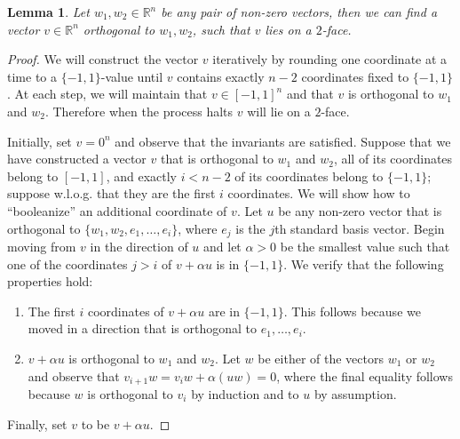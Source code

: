 \documentclass[11pt]{article}
\newtheorem{lemma}[theorem]{Lemma}
\begin{document}
\begin{lemma} \label{lem:orthogonal_vector}
Let $w_1, w_2 \in \mathbb{R}^n$ be any pair of non-zero vectors, then we can find a vector $v \in \mathbb{R}^n$ orthogonal to $w_1, w_2$, such that $v$ lies on a $2$-face.
\end{lemma}
\begin{proof}
	We will construct the vector $v$ iteratively by rounding one coordinate at a time to a $\{-1,1\}$-value until $v$ contains exactly $n-2$ coordinates fixed to $\{-1,1\}$. At each step, we will maintain that $v \in [-1,1]^n$ and that $v$ is orthogonal to $w_1$ and $w_2$. Therefore when the process halts $v$ will lie on a $2$-face.
	
	Initially, set $v = 0^n$ and observe that the invariants are satisfied. Suppose that we have constructed a vector $v$ that is orthogonal to $w_1$ and $w_2$, all of its coordinates belong to $[-1,1]$, and exactly $i < n-2$ of its coordinates belong to $\{-1,1\}$; suppose w.l.o.g. that they are the first $i$ coordinates. We will show how to ``booleanize'' an additional coordinate of $v$. Let $u$ be any non-zero vector that is orthogonal to $\{w_1, w_2, e_1, \ldots, e_i\}$, where $e_j$ is the $j$th standard basis vector. Begin moving from $v$ in the direction of $u$ and let $\alpha > 0$ be the smallest value such that one of the coordinates $j > i$ of $v + \alpha u$ is in $\{-1, 1\}$. %
	We verify that the following properties hold:
	\begin{enumerate}
		\item The first $i$ coordinates of $v + \alpha u$ are in $\{ -1, 1\}$. This follows because we moved in a direction that is orthogonal to $e_1, \ldots, e_i$. %
		\item $v + \alpha u$ is orthogonal to $w_1$ and $w_2$. Let $w$ be either of the vectors $w_1$ or $w_2$ and observe that  $v_{i+1}w = v_iw + \alpha (uw) = 0$,
		where the final equality follows because $w$ is orthogonal to $v_i$ by induction and to $u$ by assumption. 
	\end{enumerate}
	Finally, set $v$ to be  $v + \alpha u$. 
\end{proof}
\end{document}

